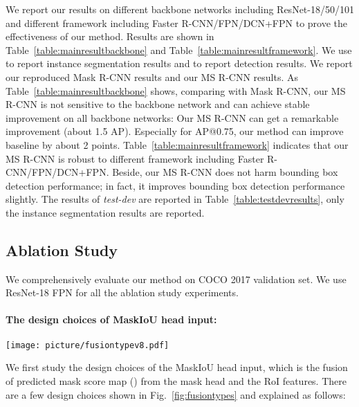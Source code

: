\documentclass[10pt,twocolumn,letterpaper]{article}
\begin{document}
    We report our results on different backbone networks including ResNet-18/50/101 and different framework including Faster R-CNN/FPN/DCN+FPN \cite{dai2017deformable} to prove the effectiveness of our method. Results are shown in Table~\ref{table:mainresultbackbone} and Table~\ref{table:mainresultframework}. We use  to report instance segmentation results and  to report detection results. We report our reproduced Mask R-CNN results and our MS R-CNN results. As Table~\ref{table:mainresultbackbone} shows, comparing with Mask R-CNN, our MS R-CNN is not sensitive to the backbone network and can achieve stable improvement on all backbone networks: Our MS R-CNN can get a remarkable improvement (about 1.5 AP). Especially for AP@0.75, our method can improve baseline by about 2 points.  Table~\ref{table:mainresultframework} indicates that our MS R-CNN is robust to different framework including Faster R-CNN/FPN/DCN+FPN. Beside, our MS R-CNN does not harm bounding box detection performance; in fact, it improves bounding box detection performance slightly. The results of \emph{test-dev} are reported in Table~\ref{table:testdevresults}, only the instance segmentation results are reported. 




\subsection{Ablation Study}
    We comprehensively evaluate our method on COCO 2017 validation set. We use ResNet-18 FPN for all the ablation study experiments.
    
\paragraph{The design choices of MaskIoU head input:}

\begin{figure*}
\centering
\texttt{[image: picture/fusiontypev8.pdf]}
\caption{Different design choices of the MaskIoU head input.}  
\label{fig:fusiontypes}
\end{figure*} 



    We first study the design choices of the MaskIoU head input, which is the fusion of predicted mask score map () from the mask head and the RoI features. There are a few design choices shown in Fig.~\ref{fig:fusiontypes} and explained as follows:
    
\end{document}
